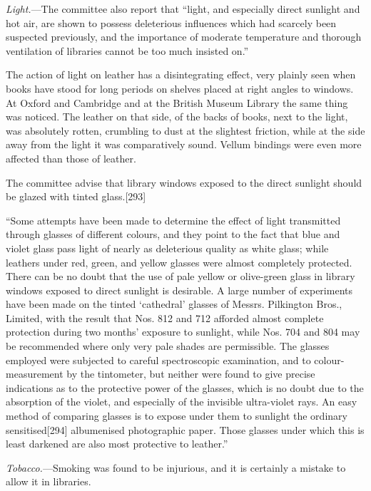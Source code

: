 \documentclass[
]{article}
\begin{document}
\emph{Light.}---The committee also report that ``light, and especially
direct sunlight and hot air, are shown to possess deleterious influences
which had scarcely been suspected previously, and the importance of
moderate temperature and thorough ventilation of libraries cannot be too
much insisted on.''

The action of light on leather has a disintegrating effect, very plainly
seen when books have stood for long periods on shelves placed at right
angles to windows. At Oxford and Cambridge and at the British Museum
Library the same thing was noticed. The leather on that side, of the
backs of books, next to the light, was absolutely rotten, crumbling to
dust at the slightest friction, while at the side away from the light it
was comparatively sound. Vellum bindings were even more affected than
those of leather.

The committee advise that library windows exposed to the direct sunlight
should be glazed with tinted
glass.{\protect\hypertarget{Page_293}{}{{[}293{]}}}

``Some attempts have been made to determine the effect of light
transmitted through glasses of different colours, and they point to the
fact that blue and violet glass pass light of nearly as deleterious
quality as white glass; while leathers under red, green, and yellow
glasses were almost completely protected. There can be no doubt that the
use of pale yellow or olive-green glass in library windows exposed to
direct sunlight is desirable. A large number of experiments have been
made on the tinted `cathedral' glasses of Messrs. Pilkington Bros.,
Limited, with the result that Nos. 812 and 712 afforded almost complete
protection during two months' exposure to sunlight, while Nos. 704 and
804 may be recommended where only very pale shades are permissible. The
glasses employed were subjected to careful spectroscopic examination,
and to colour-measurement by the tintometer, but neither were found to
give precise indications as to the protective power of the glasses,
which is no doubt due to the absorption of the violet, and especially of
the invisible ultra-violet rays. An easy method of comparing glasses is
to expose under them to sunlight the ordinary
sensitised{\protect\hypertarget{Page_294}{}{{[}294{]}}} albumenised
photographic paper. Those glasses under which this is least darkened are
also most protective to leather.''

\emph{Tobacco.}---Smoking was found to be injurious, and it is certainly
a mistake to allow it in libraries.
\end{document}
